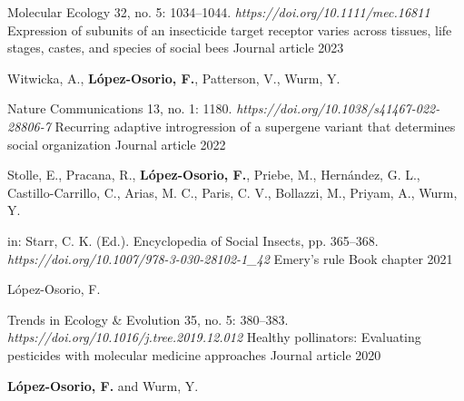 {\color{awesome}\faFile*}


\begin{cventries}

  \cventry
    {Molecular Ecology 32, no. 5: 1034–1044. \textit{https://doi.org/10.1111/mec.16811}} %
    {Expression of subunits of an insecticide target receptor varies across tissues, 
    life stages, castes, and species of social bees} %
    {Journal article} %
    {2023} %
    {
      \begin{cvitems} %
        \item {Witwicka, A., \textbf{López-Osorio, F.}, Patterson, V., Wurm, Y.}
      \end{cvitems}
    }

  \cventry
    {Nature Communications 13, no. 1: 1180. \textit{https://doi.org/10.1038/s41467-022-28806-7}} %
    {Recurring adaptive introgression of a supergene variant that determines social organization} %
    {Journal article} %
    {2022} %
    {
      \begin{cvitems} %
        \item {Stolle, E., Pracana, R., \textbf{López-Osorio, F.}, Priebe, M., Hernández, G. L., \newline
        Castillo-Carrillo, C., Arias, M. C., Paris, C. V., Bollazzi, M., Priyam, A., Wurm, Y.}
      \end{cvitems}
    }

  \cventry
    {in: Starr, C. K. (Ed.). Encyclopedia of Social Insects, pp. 365–368. \textit{https://doi.org/10.1007/978-3-030-28102-1\_42}} %
    {Emery's rule} %
    {Book chapter} %
    {2021} %
    {
      \begin{cvitems} %
        \item {López-Osorio, F.}
      \end{cvitems}
    }

  \cventry
    {Trends in Ecology \& Evolution 35, no. 5: 380–383. \textit{https://doi.org/10.1016/j.tree.2019.12.012}} %
    {Healthy pollinators: Evaluating pesticides with molecular medicine approaches} %
    {Journal article} %
    {2020} %
    {
      \begin{cvitems} %
        \item {\textbf{López-Osorio, F.} and Wurm, Y.}
      \end{cvitems}
    }


\end{cventries}
